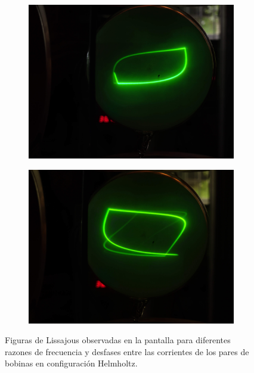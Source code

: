 \begin{figure}[htbp!]
	\centering
	\begin{subfigure}{0.45\linewidth}
		\includegraphics[width=\linewidth]{../Figures/liss-one.jpg}
		\label{fig:res_lissajous_circ}
	\end{subfigure}
	\hfill
	\begin{subfigure}{0.45\linewidth}
		\includegraphics[width=\linewidth]{../Figures/liss-two.jpg}
		\label{fig:res_lissajous_2_1}
	\end{subfigure}
	\caption{Figuras de Lissajous observadas en la pantalla para diferentes
		razones de frecuencia y desfases entre las corrientes de los pares de
	bobinas en configuración Helmholtz.}
	\label{fig:resultados_lissajous}
\end{figure}

